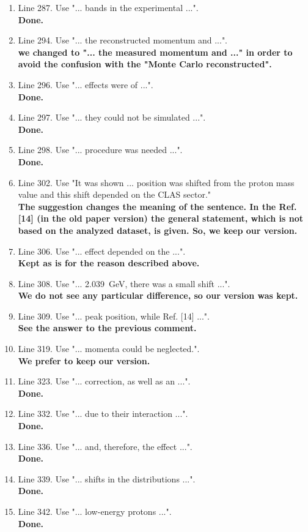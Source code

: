 \documentclass[,superscriptaddress,showpacs,amssymb,amsmath,amsfonts,linenumbers,article]{revtex4-1}
\begin{document}
\begin{itemize}
\begin{enumerate}
\item Line 287. Use "... bands in the experimental ...".\\
{\bf Done.}
\item Line 294. Use "... the reconstructed momentum and ...".\\
{\bf we changed to "... the measured momentum and ..." in order to avoid the confusion with the "Monte  Carlo reconstructed".}
\item Line 296. Use "... effects were of ...".\\
{\bf Done.}
\item Line 297. Use "... they could not be simulated ...".\\
{\bf Done.}
\item Line 298. Use "... procedure was needed ...".\\
{\bf Done.}
\item Line 302. Use "It was shown ... position was shifted from the proton mass value and this shift depended on the CLAS sector."\\
{\bf The suggestion changes the meaning of the sentence. In the Ref.[14] (in the old paper version) the general statement, which is not based on the analyzed dataset, is given. So, we keep our version.}
\item Line 306. Use "... effect depended on the ...".\\
{\bf Kept as is for the reason described above.} 
\item Line 308. Use "... 2.039~GeV, there was a small shift ...".\\
{\bf We do not see any particular difference, so our version was kept.}
\item Line 309. Use "... peak position, while Ref. [14] ...".\\
{\bf See the answer to the previous comment.}
\item Line 319. Use "... momenta could be neglected.".\\
{\bf We prefer to keep our version.}
\item Line 323. Use "... correction, as well as an ...".\\
{\bf Done.}
\item Line 332. Use "... due to their interaction ...".\\
{\bf Done.}
\item Line 336. Use "... and, therefore, the effect ...".\\
{\bf Done.}
\item Line 339. Use "... shifts in the distributions ...".\\
{\bf Done.}
\item Line 342. Use "... low-energy protons ...".\\
{\bf Done.}


\end{enumerate}
\end{itemize}
\end{document}
